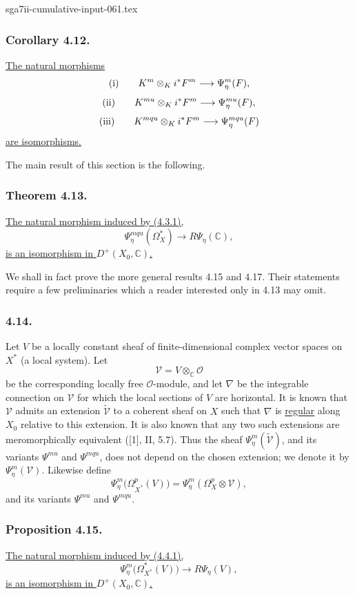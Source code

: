\begin{filecontents*}{sga7ii-cumulative-input-061.tex}
\subsubsection*{Corollary 4.12.}
\underline{The natural morphisms}
\[
\textup{(i)}\qquad
K^m\otimes_K i^*F^m\longrightarrow\Psi_\eta^m(F),
\]
\[
\textup{(ii)}\qquad
K^{mu}\otimes_K i^*F^m\longrightarrow\Psi_\eta^{mu}(F),
\]
\[
\textup{(iii)}\qquad
K^{mqu}\otimes_K i^*F^m\longrightarrow\Psi_\eta^{mqu}(F)
\]
\underline{are isomorphisms.}

The main result of this section is the following.

\subsubsection*{Theorem 4.13.}
\underline{The natural morphism induced by (4.3.1),}
\begin{equation}\tag{4.13.1}
\Psi_\eta^{mqu}(\Omega_X^*)
\longrightarrow R\Psi_\eta(\mathbb C),
\end{equation}
\underline{is an isomorphism in $D^+(X_0,\mathbb C)$.}

We shall in fact prove the more general results 4.15 and 4.17.  Their
statements require a few preliminaries which a reader interested only
in 4.13 may omit.

\subsubsection*{4.14.}
Let $V$ be a locally constant sheaf of finite-dimensional complex
vector spaces on $X^*$ (a local system).  Let
\[
\mathcal V=V\otimes_{\mathbb C}\mathcal O
\]
be the corresponding locally free $\mathcal O$-module, and let
$\nabla$ be the integrable connection on $\mathcal V$ for which the
local sections of $V$ are horizontal.  It is known that $\mathcal V$
admits an extension $\widetilde{\mathcal V}$ to a coherent sheaf on
$X$ such that $\nabla$ is \underline{regular} along $X_0$ relative to
this extension.  It is also known that any two such extensions are
meromorphically equivalent ([1], II, 5.7).  Thus the sheaf
$\Psi_\eta^m(\widetilde{\mathcal V})$, and its variants
$\Psi^{mu}$ and $\Psi^{mqu}$, does not depend on the chosen extension;
we denote it by $\Psi_\eta^m(\mathcal V)$.  Likewise define
\[
\Psi_\eta^m\bigl(\Omega_{X^*}^p(V)\bigr)
=\Psi_\eta^m(\Omega_X^p\otimes\mathcal V),
\]
and its variants $\Psi^{mu}$ and $\Psi^{mqu}$.

\subsubsection*{Proposition 4.15.}
\underline{The natural morphism induced by (4.4.1),}
\begin{equation}\tag{4.15.1}
\Psi_\eta^m\bigl(\Omega_{X^*}^*(V)\bigr)
\longrightarrow R\Psi_\eta(V),
\end{equation}
\underline{is an isomorphism in $D^+(X_0,\mathbb C)$.}


\end{filecontents*}
